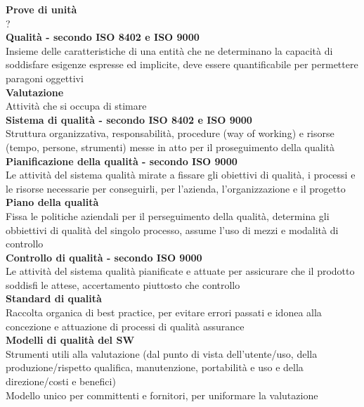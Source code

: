 \documentclass{article}
\begin{document}
		\textbf{Prove di unità}\\
		?\\
		
		\textbf{Qualità - secondo ISO 8402 e ISO 9000}\\
		Insieme delle caratteristiche di una entità che ne determinano la capacità di soddisfare esigenze espresse ed implicite, deve essere quantificabile per permettere paragoni oggettivi\\
		
		\textbf{Valutazione}\\
		Attività che si occupa di stimare\\
		
		\textbf{Sistema di qualità - secondo ISO 8402 e ISO 9000}\\
		Struttura organizzativa, responsabilità, procedure (way of working) e risorse (tempo, persone, strumenti) messe in atto per il proseguimento della qualità\\
		
		\textbf{Pianificazione della qualità - secondo ISO 9000}\\
		Le attività del sistema qualità mirate a fissare gli obiettivi di qualità, i processi e le risorse necessarie per conseguirli, per l'azienda, l'organizzazione e il progetto\\
				
		\textbf{Piano della qualità}\\
		Fissa le politiche aziendali per il perseguimento della qualità, determina gli obbiettivi di qualità del singolo processo, assume l'uso di mezzi e modalità di controllo\\
		
		\textbf{Controllo di qualità - secondo ISO 9000}\\
		Le attività del sistema qualità pianificate e attuate per assicurare che il prodotto soddisfi le attese, accertamento piuttosto che controllo\\
		
		\textbf{Standard di qualità}\\
		Raccolta organica di best practice, per evitare errori passati e idonea alla concezione e attuazione di processi di qualità assurance\\
		
		\textbf{Modelli di qualità del SW}\\
		Strumenti utili alla valutazione (dal punto di vista dell'utente/uso, della produzione/rispetto qualifica, manutenzione, portabilità e uso e della direzione/costi e benefici)\\
		Modello unico per committenti e fornitori, per uniformare la valutazione\\
		
\end{document}
